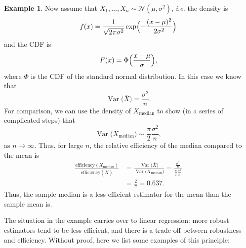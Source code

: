 \documentclass[
  a4paper,
]{article}
\theoremstyle{definition}
\theoremstyle{definition}
\newtheorem{example}{Example}[section]
\theoremstyle{definition}
\theoremstyle{definition}
\theoremstyle{remark}
\begin{document}
\begin{example}
Now assume that \(X_1, \ldots, X_n \sim \mathcal{N}(\mu, \sigma^2)\), \emph{i.e.}
the density is
\begin{equation*}
  f(x)
  = \frac{1}{\sqrt{2\pi\sigma^2}} \exp\Bigl( - \frac{(x-\mu)^2}{2\sigma^2} \Bigr)
\end{equation*}
and the CDF is
\begin{equation*}
  F(x) = \Phi\Bigl( \frac{x - \mu}{\sigma} \Bigr),
\end{equation*}
where \(\Phi\) is the CDF of the standard normal distribution. In this case
we know that
\begin{equation*}
  \mathop{\mathrm{Var}}\bigl( \overline X \bigr)
  = \frac{\sigma^2}{n}.
\end{equation*}
For comparison, we can use the density of \(X_\mathrm{median}\) to show
(in a series of complicated steps) that
\begin{equation*}
  \mathop{\mathrm{Var}}\bigl( X_\mathrm{median} \bigr)
  \sim \frac{\pi}{2} \frac{\sigma^2}{n},
\end{equation*}
as \(n\to\infty\). Thus, for large \(n\), the relative efficiency
of the median compared to the mean is
\begin{align*}
  \frac{\mathrm{efficiency}(X_\mathrm{median})}{\mathrm{efficiency}(\overline{X})}
  &= \frac{\mathop{\mathrm{Var}}\bigl( \overline X \bigr)}{\mathop{\mathrm{Var}}\bigl( X_\mathrm{median} \bigr)}
      = \frac{\frac{\sigma^2}{n}}{\frac{\pi}{2} \frac{\sigma^2}{n}} \\
  &= \frac{2}{\pi}
      = 0.637.
\end{align*}
Thus, the sample median is a less efficient estimator for the mean than
the sample mean is.
\end{example}

The situation in the example carries over to linear regression: more robust
estimators tend to be less efficient, and there is a trade-off between
robustness and efficiency. Without proof, here we list some examples of this
principle:
\end{document}
